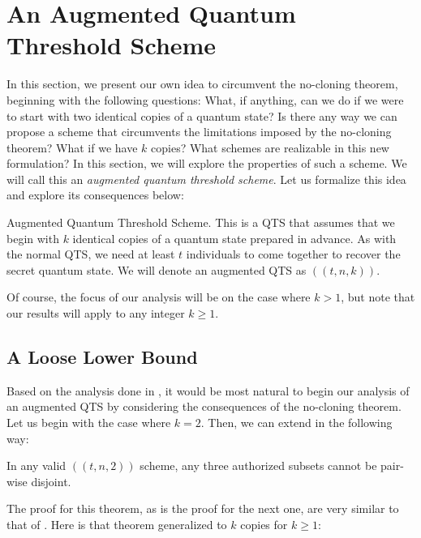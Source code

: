 \chapter{An Augmented Quantum Threshold Scheme}
\label{ch:good-stuff}

In this section, we present our own idea to circumvent the no-cloning theorem, beginning with the following questions: What, if anything, can we do if we were to start with two identical copies of a quantum state? Is there any way we can propose a scheme that circumvents the limitations imposed by the no-cloning theorem? What if we have $k$ copies? What schemes are realizable in this new formulation? In this section, we will explore the properties of such a scheme. We will call this an \textit{augmented quantum threshold scheme}. Let us formalize this idea and explore its consequences below:

\theoremstyle{definition}
\begin{definition}{Augmented Quantum Threshold Scheme.}
    \label{defn:augmented-qts}
     This is a QTS that assumes that we begin with $k$ identical copies of a quantum state prepared in advance. As with the normal QTS, we need at least $t$ individuals to come together to recover the secret quantum state. We will denote an augmented QTS as $((t,n,k))$.
\end{definition}

Of course, the focus of our analysis will be on the case where $k>1$, but note that our results will apply to any integer $k \geq 1$.

\section{A Loose Lower Bound}

Based on the analysis done in , it would be most natural to begin our analysis of an augmented QTS by considering the consequences of the no-cloning theorem. Let us begin with the case where $k=2$. Then, we can extend  in the following way:

\begin{theorem}
    \label{thm:three-authorized}
    In any valid $((t,n,2))$ scheme, any three authorized subsets cannot be pair-wise disjoint.
\end{theorem}

The proof for this theorem, as is the proof for the next one, are very similar to that of . Here is that theorem generalized to $k$ copies for $k \geq 1$:

